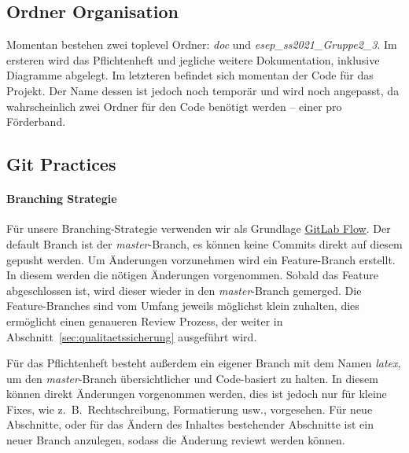 
\subsection{Ordner Organisation}\label{subsec:organisation}
Momentan bestehen zwei toplevel Ordner: \textit{doc} und \textit{esep\_ss2021\_Gruppe2\_3}.
Im ersteren wird das Pflichtenheft und jegliche weitere Dokumentation, inklusive Diagramme abgelegt.
Im letzteren befindet sich momentan der Code für das Projekt.
Der Name dessen ist jedoch noch temporär und wird noch angepasst,
da wahrscheinlich zwei Ordner für den Code benötigt werden -- einer pro Förderband.

\subsection{Git Practices}\label{subsec:git}

\paragraph{Branching Strategie}
Für unsere Branching-Strategie verwenden wir als Grundlage
\href{https://docs.gitlab.com/ee/topics/gitlab_flow.html}{GitLab Flow}.
Der default Branch ist der \textit{master}-Branch, es können keine Commits direkt auf diesem
gepusht werden.
Um Änderungen vorzunehmen wird ein Feature-Branch erstellt.
In diesem werden die nötigen Änderungen vorgenommen.
Sobald das Feature abgeschlossen ist, wird dieser wieder in den \textit{master}-Branch gemerged.
Die Feature-Branches sind vom Umfang jeweils möglichst klein zuhalten, dies ermöglicht einen
genaueren Review Prozess, der weiter in Abschnitt~\ref{sec:qualitaetssicherung} ausgeführt wird.

Für das Pflichtenheft besteht außerdem ein eigener Branch mit dem Namen \textit{latex}, um den
\textit{master}-Branch übersichtlicher und Code-basiert zu halten.
In diesem können direkt Änderungen vorgenommen werden, dies ist jedoch nur für kleine Fixes, wie
z.\ B.\ Rechtschreibung, Formatierung usw., vorgesehen.
Für neue Abschnitte, oder für das Ändern des Inhaltes bestehender Abschnitte ist ein neuer Branch
anzulegen, sodass die Änderung reviewt werden können.

